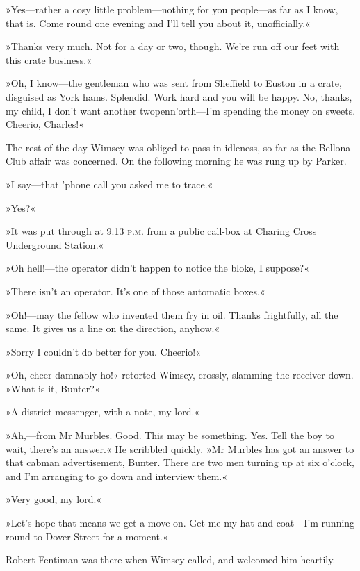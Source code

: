 »Yes\allowbreak---\allowbreak rather a cosy little problem\allowbreak---\allowbreak nothing for you people\allowbreak---\allowbreak as far as I know, that is. Come round one evening and I'll tell you about it, unofficially.«

»Thanks very much. Not for a day or two, though. We're run off our feet with this crate business.«

»Oh, I know\allowbreak---\allowbreak the gentleman who was sent from Sheffield to Euston in a crate, disguised as York hams. Splendid. Work hard and you will be happy. No, thanks, my child, I don't want another twopenn'orth\allowbreak---\allowbreak I'm spending the money on sweets. Cheerio, Charles!«

The rest of the day Wimsey was obliged to pass in idleness, so far as the Bellona Club affair was concerned. On the following morning he was rung up by Parker.

»I say\allowbreak---\allowbreak that 'phone call you asked me to trace.«

»Yes?«

»It was put through at 9.13 \textsc{p.m.} from a public call-box at Charing Cross Underground Station.«

»Oh hell!---the operator didn't happen to notice the bloke, I suppose?«

»There isn't an operator. It's one of those automatic boxes.«

»Oh!---may the fellow who invented them fry in oil. Thanks frightfully, all the same. It gives us a line on the direction, anyhow.«

»Sorry I couldn't do better for you. Cheerio!«

»Oh, cheer-damnably-ho!« retorted Wimsey, crossly, slamming the receiver down. »What is it, Bunter?«

»A district messenger, with a note, my lord.«

»Ah,---from Mr Murbles. Good. This may be something. Yes. Tell the boy to wait, there's an answer.« He scribbled quickly. »Mr Murbles has got an answer to that cabman advertisement, Bunter. There are two men turning up at six o'clock, and I'm arranging to go down and interview them.«

»Very good, my lord.«

»Let's hope that means we get a move on. Get me my hat and coat\allowbreak---\allowbreak I'm running round to Dover Street for a moment.«

Robert Fentiman was there when Wimsey called, and welcomed him heartily.

